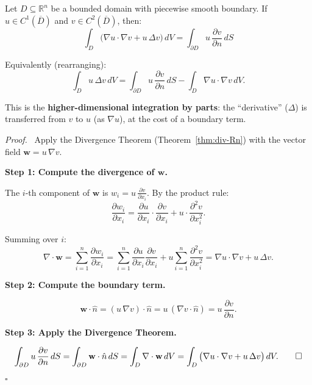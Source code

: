 \documentclass[11pt]{report}
\renewenvironment{proof}[1][Proof]{\par\noindent\textit{#1.}\ }{\hfill$\square$\par\medskip}
\newcommand{\R}{\mathbb{R}}
\newcommand{\parti}[2]{\frac{\partial #1}{\partial #2}}
\begin{document}
\begin{theorem}
\label{thm:green1}
Let $D \subseteq \R^n$ be a bounded domain with piecewise smooth boundary. If $u \in C^1(\overline{D})$ and $v \in C^2(\overline{D})$, then:
\[
\boxed{\int_D \big( \nabla u \cdot \nabla v + u \, \Delta v \big) \, dV = \int_{\partial D} u \, \frac{\partial v}{\partial n} \, dS}
\]

Equivalently (rearranging):
\[
\int_D u \, \Delta v \, dV = \int_{\partial D} u \, \frac{\partial v}{\partial n} \, dS - \int_D \nabla u \cdot \nabla v \, dV.
\]

This is the \textbf{higher-dimensional integration by parts}: the ``derivative'' ($\Delta$) is transferred from $v$ to $u$ (as $\nabla u$), at the cost of a boundary term.
\end{theorem}

\begin{proof}
Apply the Divergence Theorem (Theorem~\ref{thm:div-Rn}) with the vector field $\mathbf{w} = u \, \nabla v$.

\textbf{Step 1: Compute the divergence of $\mathbf{w}$.}

The $i$-th component of $\mathbf{w}$ is $w_i = u \, \parti{v}{x_i}$. By the product rule:
\[
\parti{w_i}{x_i} = \parti{u}{x_i} \cdot \parti{v}{x_i} + u \cdot \frac{\partial^2 v}{\partial x_i^2}.
\]

Summing over $i$:
\[
\nabla \cdot \mathbf{w} = \sum_{i=1}^n \parti{w_i}{x_i} = \sum_{i=1}^n \parti{u}{x_i} \parti{v}{x_i} + u \sum_{i=1}^n \frac{\partial^2 v}{\partial x_i^2} = \nabla u \cdot \nabla v + u \, \Delta v.
\]

\textbf{Step 2: Compute the boundary term.}

\[
\mathbf{w} \cdot \hat{n} = (u \, \nabla v) \cdot \hat{n} = u \, (\nabla v \cdot \hat{n}) = u \, \frac{\partial v}{\partial n}.
\]

\textbf{Step 3: Apply the Divergence Theorem.}

\[
\int_{\partial D} u \, \frac{\partial v}{\partial n} \, dS = \int_{\partial D} \mathbf{w} \cdot \hat{n} \, dS = \int_D \nabla \cdot \mathbf{w} \, dV = \int_D \big( \nabla u \cdot \nabla v + u \, \Delta v \big) \, dV. \qedhere
\]
\end{proof}
\end{document}
